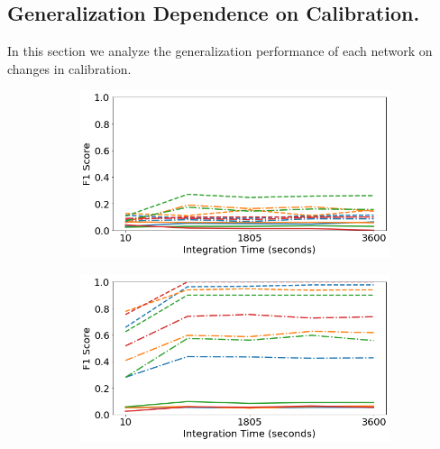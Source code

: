 \subsection{Generalization Dependence on Calibration.}

In this section we analyze the generalization performance of each network on changes in calibration.


\begin{figure}[H]
     \centering
     \begin{subfigure}[b]{0.49\textwidth}
         \centering
         \includegraphics[width=\textwidth]{images/generalization-cal-easy-01.png}
         \caption{}
         \label{fig:generalization-cal-easy-01}
     \end{subfigure}
     \hfill
     \begin{subfigure}[b]{0.49\textwidth}
         \centering
         \includegraphics[width=\textwidth]{images/generalization-cal-easy-05.png}
         \caption{}
         \label{fig:generalization-cal-easy-05}
     \end{subfigure}


\end{figure}
